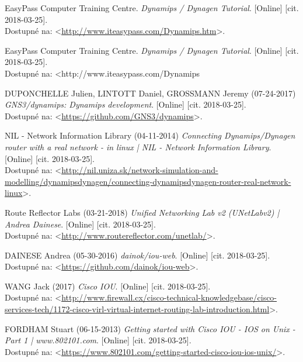 \begin{thebibliography}{99}
\label{literatura}

EasyPass Computer Training Centre. {\it Dynamips / Dynagen Tutorial}. [Online] [cit. 2018-03-25]. \\ 
Dostupné na: <\url{http://www.iteasypass.com/Dynamips.htm}>.

EasyPass Computer Training Centre. {\it Dynamips / Dynagen Tutorial}. [Online] [cit. 2018-03-25]. \\ 
Dostupné na: <http://www.iteasypass.com/Dynamips%

DUPONCHELLE Julien, LINTOTT Daniel, GROSSMANN Jeremy (07-24-2017) {\it GNS3/dynamips: Dynamips development}. [Online] [cit. 2018-03-25]. \\ 
Dostupné na: <\url{https://github.com/GNS3/dynamips}>.

NIL - Network Information Library (04-11-2014) {\it Connecting Dynamips/Dynagen router with a real network - in linux | NIL - Network Information Library}. [Online] [cit. 2018-03-25]. \\ 
Dostupné na: <\url{http://nil.uniza.sk/network-simulation-and-modelling/dynamipsdynagen/connecting-dynamipsdynagen-router-real-network-linux}>.

Route Reflector Labs (03-21-2018) {\it Unified Networking Lab v2 (UNetLabv2) | Andrea Dainese}. [Online] [cit. 2018-03-25]. \\
Dostupné na: <\url{http://www.routereflector.com/unetlab/}>.

DAINESE Andrea (05-30-2016) {\it dainok/iou-web}. [Online] [cit. 2018-03-25]. \\
Dostupné na: <\url{https://github.com/dainok/iou-web}>.

WANG Jack (2017) {\it Cisco IOU}. [Online] [cit. 2018-03-25]. \\
Dostupné na: <\url{http://www.firewall.cx/cisco-technical-knowledgebase/cisco-services-tech/1172-cisco-virl-virtual-internet-routing-lab-introduction.html}>.

FORDHAM Stuart (06-15-2013) {\it Getting started with Cisco IOU - IOS on Unix - Part 1 | www.802101.com}. [Online] [cit. 2018-03-25]. \\
Dostupné na: <\url{https://www.802101.com/getting-started-cisco-iou-ios-unix/}>.


\end{thebibliography}
